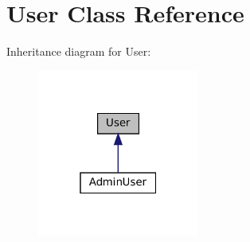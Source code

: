 \hypertarget{classUser}{}\section{User Class Reference}
\label{classUser}


Inheritance diagram for User\+:
\nopagebreak
\begin{figure}[H]
\begin{center}
\leavevmode
\includegraphics[width=151pt]{classUser__inherit__graph}
\end{center}
\end{figure}
